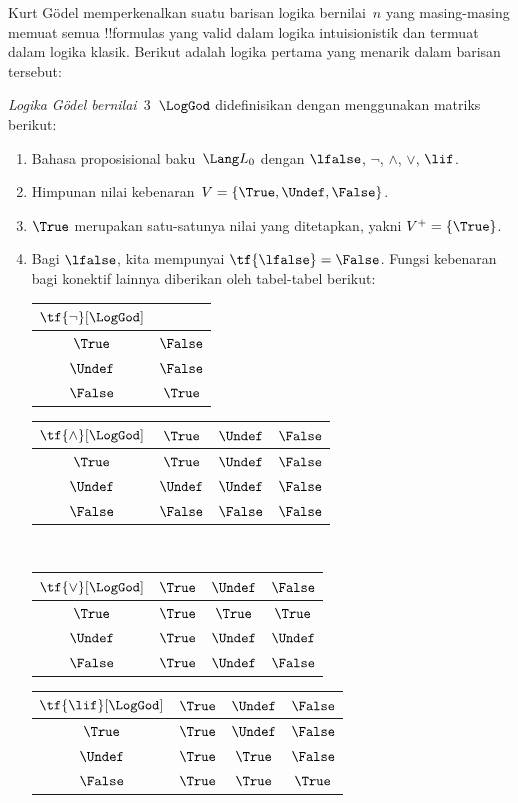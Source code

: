 \documentclass[../../../include/open-logic-section]{subfiles}
\begin{document}


Kurt G\"odel memperkenalkan suatu barisan logika bernilai~$n$ yang masing-masing
memuat semua !!{formula}s yang valid dalam logika intuisionistik dan termuat
dalam logika klasik. Berikut adalah logika pertama yang menarik dalam barisan
tersebut:

\begin{defn}
\emph{Logika G\"odel bernilai~$3$}~$\LogGod$ didefinisikan dengan menggunakan
matriks berikut:
\begin{enumerate}
  \item Bahasa proposisional baku~$\Lang L_0$ dengan $\lfalse$, $\lnot$,
  $\land$, $\lor$, $\lif$.
  \item Himpunan nilai kebenaran~$V=\{\True,\Undef,\False\}$.
  \item $\True$ merupakan satu-satunya nilai yang ditetapkan, yakni
  $V^+=\{\True\}$.
  \item Bagi $\lfalse$, kita mempunyai $\tf{\lfalse}=\False$. Fungsi
  kebenaran bagi konektif lainnya diberikan oleh tabel-tabel berikut:
  \begin{center}
    \begin{tabular}{c|c}
      $\tf{\lnot}[\LogGod]$ & \\
      \hline
      $\True$ & $\False$ \\
      $\Undef$ & $\False$ \\
      $\False$ & $\True$
    \end{tabular}
    \quad
    \begin{tabular}{c|ccc}
      $\tf{\land}[\LogGod]$ & $\True$ & $\Undef$ & $\False$ \\
      \hline
      $\True$ & $\True$ & $\Undef$ & $\False$ \\
      $\Undef$ & $\Undef$ & $\Undef$ & $\False$\\
      $\False$ & $\False$ & $\False$ & $\False$
    \end{tabular}
    \\[2ex]
    \begin{tabular}{c|ccc}
      $\tf{\lor}[\LogGod]$ & $\True$ & $\Undef$ & $\False$ \\
      \hline
      $\True$ & $\True$ & $\True$ & $\True$ \\
      $\Undef$ & $\True$ & $\Undef$ & $\Undef$ \\
      $\False$ & $\True$ & $\Undef$ & $\False$
    \end{tabular}
    \quad
    \begin{tabular}{c|ccc}
      $\tf{\lif}[\LogGod]$ & $\True$ & $\Undef$ & $\False$ \\
      \hline
      $\True$ & $\True$ & $\Undef$ & $\False$ \\
      $\Undef$ & $\True$ & $\True$ & $\False$  \\
      $\False$ & $\True$ & $\True$ & $\True$
    \end{tabular}
  \end{center}
\end{enumerate}
\end{defn}
\end{document}
